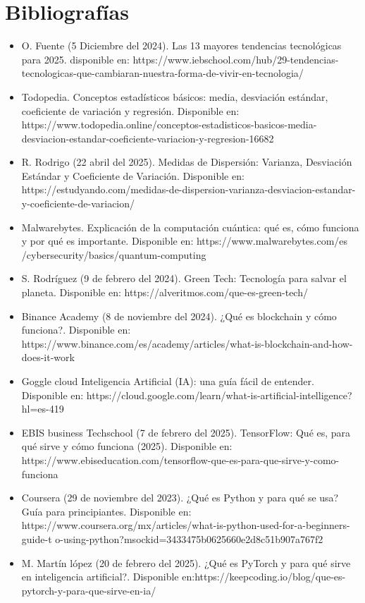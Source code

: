 \documentclass[oneside,11pt]{Latex/Classes/PhDthesisPSnPDF}
\begin{document}
\chapter{Bibliografías}

\begin{flushleft}
\begin{itemize}
  \item O. Fuente (5 Diciembre del 2024). Las 13 mayores tendencias tecnológicas para 2025. disponible en: https://www.iebschool.com/hub/29-tendencias-tecnologicas-que-cambiaran-nuestra-forma-de-vivir-en-tecnologia/
  \item Todopedia. Conceptos estadísticos básicos: media, desviación estándar, coeficiente de variación y regresión. Disponible en: https://www.todopedia.online/conceptos-estadisticos-basicos-media-desviacion-estandar-coeficiente-variacion-y-regresion-16682
  \item R. Rodrigo (22 abril del 2025). Medidas de Dispersión: Varianza, Desviación Estándar y Coeficiente de Variación. Disponible en: https://estudyando.com/medidas-de-dispersion-varianza-desviacion-estandar-y-coeficiente-de-variacion/
  \item Malwarebytes. Explicación de la computación cuántica: qué es, cómo funciona y por qué es importante. Disponible en: 
  https://www.malwarebytes.com/es
/cybersecurity/basics/quantum-computing
  \item S. Rodríguez (9 de febrero del 2024). Green Tech: Tecnología para salvar el planeta. Disponible en: https://alveritmos.com/que-es-green-tech/
  \item Binance Academy (8 de noviembre del 2024). ¿Qué es blockchain y cómo funciona?. Disponible en: https://www.binance.com/es/academy/articles/what-is-blockchain-and-how-does-it-work
  \item Goggle cloud  Inteligencia Artificial (IA): una guía fácil de entender. Disponible en: https://cloud.google.com/learn/what-is-artificial-intelligence?hl=es-419
  \item EBIS business Techschool (7 de febrero del 2025). TensorFlow: Qué es, para qué sirve y cómo funciona (2025). Disponible en: https://www.ebiseducation.com/tensorflow-que-es-para-que-sirve-y-como-funciona
  \item Coursera (29 de noviembre del 2023). ¿Qué es Python y para qué se usa? Guía para principiantes. Disponible en: https://www.coursera.org/mx/articles/what-is-python-used-for-a-beginners-guide-t
o-using-python?msockid=3433475b0625660e2d8c51b907a767f2
  \item M. Martín lópez (20 de febrero del 2025). ¿Qué es PyTorch y para qué sirve en inteligencia artificial?. Disponible en:https://keepcoding.io/blog/que-es-pytorch-y-para-que-sirve-en-ia/

\end{itemize}
\end{flushleft}
\end{document}
